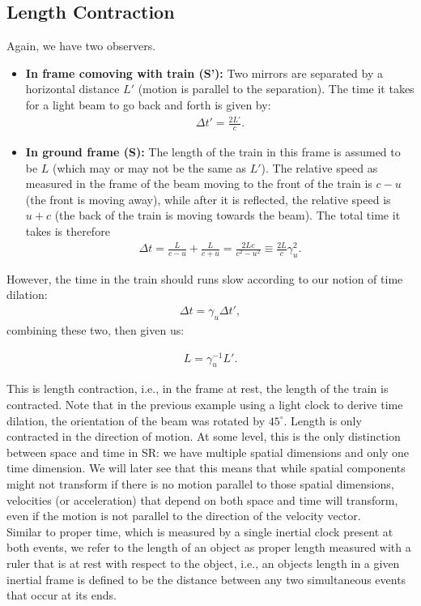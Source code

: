 \documentclass[12pt]{article}
\newcommand{\be}{\begin{eqnarray}}
\newcommand{\ee}{\end{eqnarray}}
\begin{document}
\subsection{Length Contraction}\label{sec:lR}

Again, we have two observers. 
\begin{itemize}
\item \textbf{In frame comoving with train (S'):}
Two mirrors are separated by a horizontal distance $L'$ (motion is parallel to the separation). The time it takes for a light beam to go back and forth is given by:
\be
\Delta t' = \frac{2L'}{c}.
\ee
\item \textbf{In ground frame (S):} The length of the train in this frame is assumed to be $L$ (which may or may not be the same as $L'$). The relative speed as measured in the frame of the beam moving to the front of the train is $c-u$ (the front is moving away), while after it is reflected, the relative speed is $u+c$ (the back of the train is moving towards the beam). The total time it takes is therefore
\be
\Delta t = \frac{L}{c-u} + \frac{L}{c+u} = \frac{2 L c}{c^2-u^2} \equiv \frac{2L}{c} \gamma_u^2.
\ee
\end{itemize}
However, the time in the train should runs slow according to our notion of time dilation:
\be
\Delta t = \gamma_u \Delta t',
\ee
combining these two, then given us:
\begin{tcolorbox}[colback=blue!5!white]
\vspace{-1.3em}
\be
L  = \gamma_u^{-1} L'.
\ee
\end{tcolorbox}
\noindent
This is length contraction, i.e., in the frame at rest, the length of the train is contracted. Note that in the previous example using a light clock to derive time dilation, the orientation of the beam was rotated by $45^{\circ}$. Length is only contracted in the direction of motion. At some level, this is the only distinction between space and time in SR: we have multiple spatial dimensions and only one time dimension. We will later see that this means that while spatial components might not transform if there is no motion parallel to those spatial dimensions, velocities (or acceleration) that depend on both space and time will transform, even if the motion is not parallel to the direction of the velocity vector. \\

\noindent 
Similar to proper time, which is measured by a single inertial clock present at both events, we refer to the length of an object as proper length measured with a ruler that is at rest with respect to the object, i.e., an objects length in a given inertial frame is defined to be the distance between any two simultaneous events that occur at its ends. \\
\end{document}
